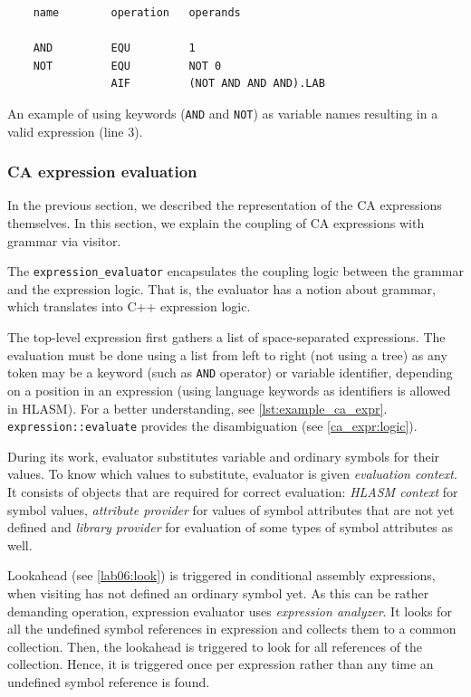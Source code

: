 \begin{listing}[t]
	\begin{verbatim}
    name        operation   operands
	
    AND         EQU         1
    NOT         EQU         NOT 0
                AIF         (NOT AND AND AND).LAB
	\end{verbatim} 
	\caption{An example of using keywords (\texttt{AND} and \texttt{NOT}) as variable names resulting in a valid expression (line 3).}
	\label{lst:example_ca_expr}
\end{listing}

\subsubsection{CA expression evaluation}
\label{ca_expr:eval}

In the previous section, we described the representation of the CA expressions themselves. In this section, we explain the coupling of CA expressions with grammar via visitor. 

The \texttt{expression\_evaluator} encapsulates the coupling logic between the grammar and the expression logic. That is, the evaluator has a notion about grammar, which translates into C++ expression logic.

The top-level expression first gathers a list of space-separated expressions. The evaluation must be done using a list from left to right (not using a tree) as any token may be a keyword (such as \texttt{AND} operator) or variable identifier, depending on a position in an expression (using language keywords as identifiers is allowed in HLASM). For a better understanding, see \cref{lst:example_ca_expr}. \texttt{expression::evaluate} provides the disambiguation (see \cref{ca_expr:logic}). 

During its work, evaluator substitutes variable and ordinary symbols for their values. To know which values to substitute, evaluator is given \emph{evaluation context}. It consists of objects that are required for correct evaluation: \emph{HLASM context} for symbol values, \emph{attribute provider} for values of symbol attributes that are not yet defined and \emph{library provider} for evaluation of some types of symbol attributes as well.

Lookahead (see \cref{lab06:look}) is triggered in conditional assembly expressions, when visiting has not defined an ordinary symbol yet. As this can be rather demanding operation, expression evaluator uses \emph{expression analyzer}. It looks for all the undefined symbol references in expression and collects them to a common collection. Then, the lookahead is triggered to look for all references of the collection. Hence, it is triggered once per expression rather than any time an undefined symbol reference is found. 

